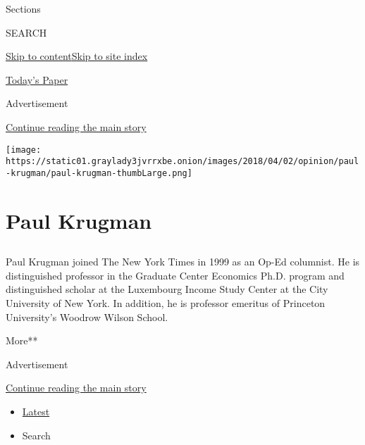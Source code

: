 Sections

SEARCH

\protect\hyperlink{site-content}{Skip to
content}\protect\hyperlink{site-index}{Skip to site index}

\href{https://myaccount.nytimes3xbfgragh.onion/auth/login?response_type=cookie\&client_id=vi}{}

\href{https://www.nytimes3xbfgragh.onion/section/todayspaper}{Today's
Paper}

Advertisement

\protect\hyperlink{after-top}{Continue reading the main story}

\texttt{[image: https://static01.graylady3jvrrxbe.onion/images/2018/04/02/opinion/paul-krugman/paul-krugman-thumbLarge.png]}

\hypertarget{paul-krugman}{%
\section{Paul Krugman}\label{paul-krugman}}

\hypertarget{section}{%
\subsection{}\label{section}}

Paul Krugman joined The New York Times in 1999 as an Op-Ed columnist. He
is distinguished professor in the Graduate Center Economics Ph.D.
program and distinguished scholar at the Luxembourg Income Study Center
at the City University of New York. In addition, he is professor
emeritus of Princeton University's Woodrow Wilson School.

More**

Advertisement

\protect\hyperlink{after-mid1}{Continue reading the main story}

\begin{itemize}
\tightlist
\item
  \protect\hyperlink{stream-panel}{Latest}
\item
  Search
\end{itemize}

